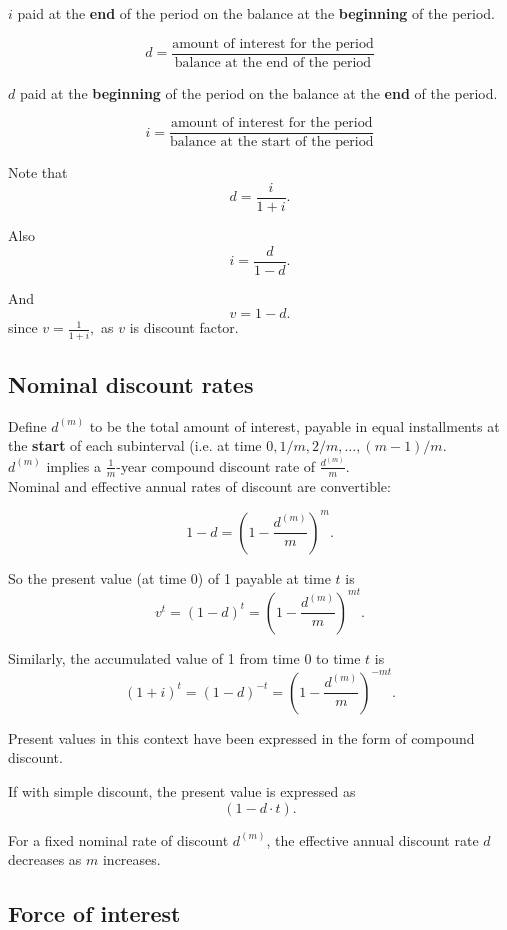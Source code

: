 \documentclass[a4paper, 11pt, twoside]{article}
\begin{document}
$i$ paid at the \textbf{end} of the period on the balance at the \textbf{beginning} of the period.

\[d = \frac{\text{amount of interest for the period}}{\text{balance at the end of the period}}\]

$d$ paid at the \textbf{beginning} of the period on the balance at the \textbf{end} of the period.

\[i = \frac{\text{amount of interest for the period}}{\text{balance at the start of the period}}\]

Note that \[d = \frac{i}{1+i}.\]

Also \[i=\frac{d}{1-d}.\]

And \[v=1-d.\] since $v=\frac{1}{1+i},$ as $v$ is discount factor.\\

\subsection{Nominal discount rates}

Define $d^{(m)}$ to be the total amount of interest, payable in equal installments at the \textbf{start} of each subinterval (i.e. at time $0, 1/m, 2/m, \dots, (m-1)/m.$\\

$d^{(m)}$ implies a $\frac{1}{m}$-year compound discount rate of $\frac{d^{(m)}}{m}.$\\

Nominal and effective annual rates of discount are convertible:

\[1-d = \left(1-\frac{d^{(m)}}{m}\right)^m.\]

So the present value (at time 0) of 1 payable at time $t$ is \[v^t=(1-d)^t=\left(1-\frac{d^{(m)}}{m}\right)^{mt}.\]

Similarly, the accumulated value of 1 from time 0 to time $t$ is \[(1+i)^t=(1-d)^{-t}=\left(1-\frac{d^{(m)}}{m}\right)^{-mt}.\]

Present values in this context have been expressed in the form of compound discount.

If with simple discount, the present value is expressed as \[(1-d\cdot t).\]

For a fixed nominal rate of discount $d^{(m)}$, the effective annual discount rate $d$ decreases as $m$ increases.

\subsection{Force of interest}
\end{document}
